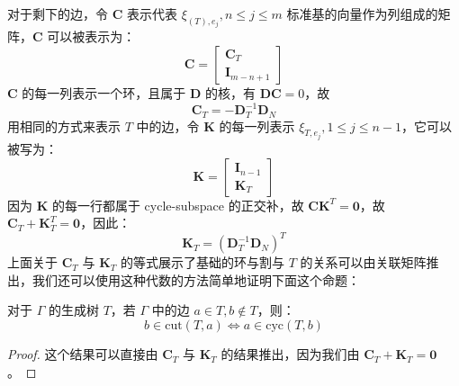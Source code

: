 对于剩下的边，令 $\textbf{C}$ 表示代表 $\xi_{(T),e_j}, n\le j\le m$ 标准基的向量作为列组成的矩阵，$\textbf{C}$ 可以被表示为：
\[
\mathbf{C} = \left[
\begin{array}{c}
\mathbf{C}_{T} \\
\mathbf{I}_{m-n+1}
\end{array}
\right]
\]
$\textbf{C}$ 的每一列表示一个环，且属于 $\textbf{D}$ 的核，有 $\textbf{DC} = 0$，故
\[
\textbf{C}_T = - \textbf{D}_T^{-1} \textbf{D}_N
\]
用相同的方式来表示 $T$ 中的边，令 $\textbf{K}$ 的每一列表示 $\xi_{T,e_j}, 1\le j\le n - 1$，它可以被写为：
\[
\textbf{K} = \left[
\begin{array}{c}
\mathbf{I}_{n-1} \\
\mathbf{K}_{T}
\end{array}
\right]
\]
因为 $\mathbf{K}$ 的每一行都属于 cycle-subspace 的正交补，故 $\textbf{CK}^T = \textbf{0}$，故 $\textbf{C}_T + \textbf{K}^T_T = \textbf{0}$，因此：
\[
\textbf{K}_T = (\textbf{D}^{-1}_T \textbf{D}_N)^T
\]
上面关于 $\textbf{C}_T$ 与 $\textbf{K}_T$ 的等式展示了基础的环与割与 $T$ 的关系可以由关联矩阵推出，我们还可以使用这种代数的方法简单地证明下面这个命题：
\begin{theorem}
对于 $\Gamma$ 的生成树 $T$，若 $\Gamma$ 中的边 $a\in T, b\notin T$，则：
\[
b\in \text{cut}(T, a) \Leftrightarrow a\in \text{cyc}(T, b)
\]
\end{theorem}
\begin{proof}
这个结果可以直接由 $\textbf{C}_T$ 与 $\textbf{K}_T$ 的结果推出，因为我们由 $\textbf{C}_T + \textbf{K}_T = \textbf{0}$。
\end{proof}


























































